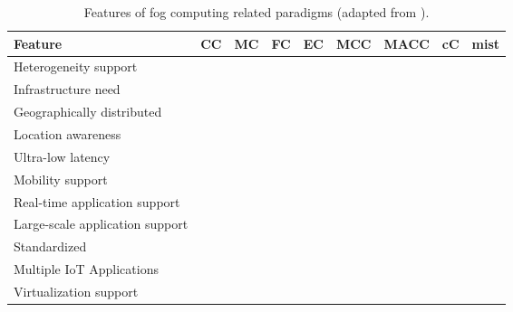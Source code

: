 \begin{table}
	\caption{Features of fog computing related paradigms (adapted from \cite{yousefpour2018all}).}
	\scriptsize
	\begin{tabular*}{\textwidth}{l >{\centering\arraybackslash}m{0.43in} >{\centering\arraybackslash}m{0.43in} >{\centering\arraybackslash}m{0.43in} >{\centering\arraybackslash}m{0.43in} >{\centering\arraybackslash}m{0.43in} >{\centering\arraybackslash}m{0.43in} >{\centering\arraybackslash}m{0.43in} >{\centering\arraybackslash}m{0.43in}}
		\toprule
		\centering\textbf{Feature} & \textbf{CC} & \textbf{MC} & \textbf{FC} & \textbf{EC} & \textbf{MCC} & \textbf{MACC} & \textbf{cC} & \textbf{mist} \\[2pt]
		\toprule
		Heterogeneity support & \cmark &  & \cmark & \cmark & \cmark &  &  & \cmark \\ \midrule
		Infrastructure need & \cmark &  & \cmark & \cmark & \cmark &  & \cmark & \cmark \\ \midrule
		Geographically distributed &  &  & \cmark & \cmark &  &  & \cmark & \cmark \\ \midrule
		Location awareness &  & \cmark & \cmark & \cmark &  & \cmark & \cmark & \cmark \\ \midrule
		Ultra-low latency &  &  & \cmark & \cmark &  &  & \cmark & \cmark \\ \midrule
		Mobility support &  & \cmark & \cmark & \cmark & \cmark & \cmark & \cmark & \cmark \\ \midrule
		Real-time application support &  &  & \cmark & \cmark &  &  & \cmark & \cmark \\ \midrule
		Large-scale application support & \cmark &  & \cmark & \cmark &  &  &  & \cmark \\ \midrule
		Standardized & \cmark & \cmark & \cmark & \cmark &  &  &  &  \\ \midrule
		Multiple IoT Applications & \cmark &  & \cmark &  &  &  & \cmark & \cmark \\ \midrule
		Virtualization support & \cmark &  & \cmark &  &  &  & \cmark &  \\ \bottomrule
	\end{tabular*}
	\label{computing_paradigms}
	\vspace{-5mm}
\end{table}
